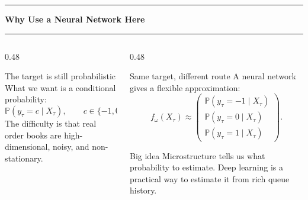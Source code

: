 \documentclass[aspectratio=169,10pt]{beamer}
\newcommand{\contentheader}[1]{%
  \vspace*{0.05em}%
  {\noindent\color{BrandOrange}\rule{0.42em}{0.42em}\hspace{0.50em}\bfseries\Large #1\par}%
  \vspace{0.15em}%
  {\color{BrandOrange}\rule{\textwidth}{1.4pt}\par}%
  \vspace{0.42em}%
}
\begin{document}
\begin{frame}[plain]
\contentheader{Why Use a Neural Network Here}
\begin{columns}[T,totalwidth=\textwidth]
\begin{column}{0.48\textwidth}
\begin{block}{The target is still probabilistic}
What we want is a conditional probability:
\[
\mathbb{P}(y_\tau=c\mid X_\tau),
\qquad c\in\{-1,0,+1\}.
\]
The difficulty is that real order books are high-dimensional, noisy, and non-stationary.
\end{block}
\end{column}
\begin{column}{0.48\textwidth}
\begin{block}{Same target, different route}
A neural network gives a flexible approximation:
\[
f_\omega(X_\tau)\approx
\begin{pmatrix}
\mathbb{P}(y_\tau=-1\mid X_\tau)\\
\mathbb{P}(y_\tau=0\mid X_\tau)\\
\mathbb{P}(y_\tau=1\mid X_\tau)
\end{pmatrix}.
\]
\end{block}
\begin{block}{Big idea}
Microstructure tells us what probability to estimate. Deep learning is a practical way to estimate it from rich queue history.
\end{block}
\end{column}
\end{columns}
\end{frame}
\end{document}
